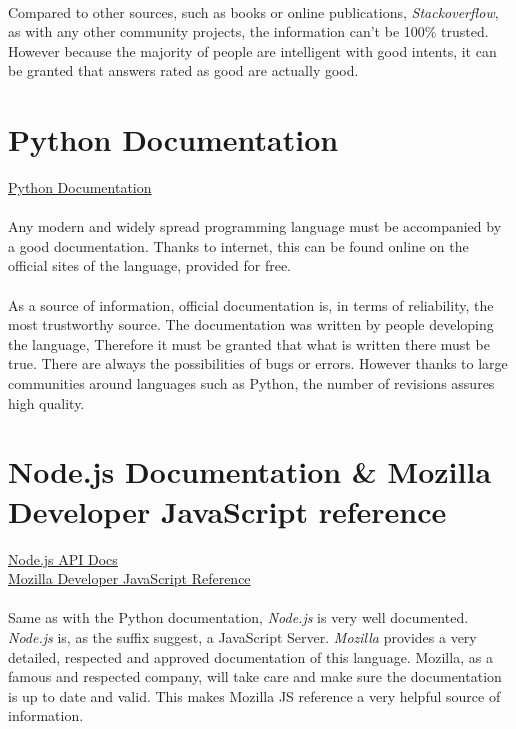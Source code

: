 \documentclass[12pt,a4paper]{report}
\begin{document}
\paragraph{}
Compared to other sources, such as books or online publications, \textit{Stackoverflow}, as with any other community projects, the information can't be 100\% trusted. However because the majority of people are intelligent with good intents, it can be granted that answers rated as good are actually good.

\section{Python Documentation}
\href{http://docs.python.org/2.7/library/index.html}{Python Documentation}

\paragraph{}
Any modern and widely spread programming language must be accompanied by a good documentation. Thanks to internet, this can be found online on the official sites of the language, provided for free.

\paragraph{}
As a source of information, official documentation is, in terms of reliability, the most trustworthy source. The documentation was written by people developing the language, Therefore it must be granted that what is written there must be true. There are always the possibilities of bugs or errors. However thanks to large communities around languages such as Python, the number of revisions assures high quality.

\section{Node.js Documentation \& Mozilla Developer JavaScript reference}
\href{http://nodejs.org/api/}{Node.js API Docs}
\\
\href{https://developer.mozilla.org/en-US/docs/Web/JavaScript/Reference}{Mozilla Developer JavaScript Reference}


\paragraph{}
Same as with the Python documentation, \textit{Node.js} is very well documented. \textit{Node.js} is, as the suffix suggest, a JavaScript Server. \textit{Mozilla} provides a very detailed, respected and approved documentation of this language. Mozilla, as a famous and respected company, will take care and make sure the documentation is up to date and valid. This makes Mozilla JS reference a very helpful source of information.
\end{document}
